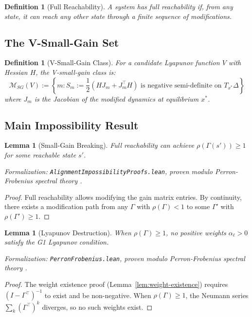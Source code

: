 \documentclass[12pt]{article}
\newtheorem{lemma}[theorem]{Lemma}
\newtheorem{definition}[theorem]{Definition}
\begin{document}
\begin{definition}[Full Reachability]
A system has \emph{full reachability} if, from any state, it can reach any other state through a finite sequence of modifications.
\end{definition}

\subsection{The V-Small-Gain Set}

\begin{definition}[V-Small-Gain Class]
For a candidate Lyapunov function $V$ with Hessian $H$, the \emph{V-small-gain class} is:
\[
\mathcal{M}_{SG}(V) := \left\{ m : S_m := \frac{1}{2}(H J_m + J_m^\top H) \text{ is negative semi-definite on } T_{x^*}\Delta \right\}
\]
where $J_m$ is the Jacobian of the modified dynamics at equilibrium $x^*$.
\end{definition}

\subsection{Main Impossibility Result}

\begin{lemma}[Small-Gain Breaking]
\label{lem:sg-breaking}
Full reachability can achieve $\rho(\Gamma(s')) \geq 1$ for some reachable state $s'$.
\end{lemma}
\noindent\textit{Formalization: \texttt{AlignmentImpossibilityProofs.lean}, proven modulo Perron-Frobenius spectral theory \citep{horn2012matrix}.}

\begin{proof}
Full reachability allows modifying the gain matrix entries. By continuity, there exists a modification path from any $\Gamma$ with $\rho(\Gamma) < 1$ to some $\Gamma'$ with $\rho(\Gamma') \geq 1$.
\end{proof}

\begin{lemma}[Lyapunov Destruction]
\label{lem:lyap-destruction}
When $\rho(\Gamma) \geq 1$, no positive weights $\alpha_\ell > 0$ satisfy the G1 Lyapunov condition.
\end{lemma}
\noindent\textit{Formalization: \texttt{PerronFrobenius.lean}, proven modulo Perron-Frobenius spectral theory \citep{horn2012matrix}.}

\begin{proof}
The weight existence proof (Lemma~\ref{lem:weight-existence}) requires $(I - \Gamma^\top)^{-1}$ to exist and be non-negative. When $\rho(\Gamma) \geq 1$, the Neumann series $\sum_k (\Gamma^\top)^k$ diverges, so no such weights exist.
\end{proof}
\end{document}
